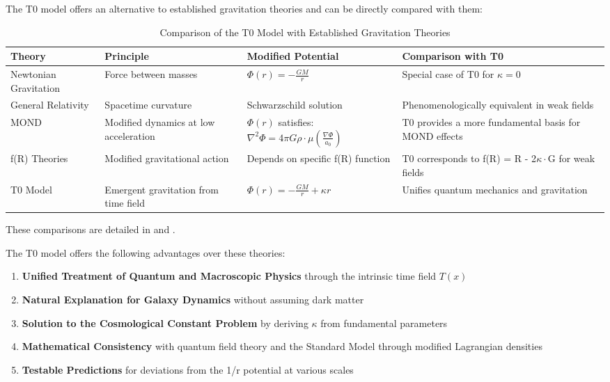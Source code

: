 \documentclass[12pt,a4paper]{article}
\begin{document}
	The T0 model offers an alternative to established gravitation theories and can be directly compared with them:
	
	\begin{table}[H]
		\centering
		\begin{tabular}{p{3cm}p{3cm}p{4cm}p{4cm}}
			\toprule
			\textbf{Theory} & \textbf{Principle} & \textbf{Modified Potential} & \textbf{Comparison with T0} \\
			\midrule
			Newtonian Gravitation & Force between masses & $\Phi(r) = -\frac{GM}{r}$ & Special case of T0 for $\kappa=0$ \\
			General Relativity & Spacetime curvature & Schwarzschild solution & Phenomenologically equivalent in weak fields \\
			MOND & Modified dynamics at low acceleration & $\Phi(r)$ satisfies: $\nabla^2\Phi = 4\pi G\rho\cdot\mu(\frac{\nabla\Phi}{a_0})$ & T0 provides a more fundamental basis for MOND effects \\
			f(R) Theories & Modified gravitational action & Depends on specific f(R) function & T0 corresponds to f(R) = R - 2$\kappa\cdot$G for weak fields \\
			T0 Model & Emergent gravitation from time field & $\Phi(r) = -\frac{GM}{r} + \kappa r$ & Unifies quantum mechanics and gravitation \\
			\bottomrule
		\end{tabular}
		\caption{Comparison of the T0 Model with Established Gravitation Theories}
		\label{tab:theory_comparison}
	\end{table}
	
	These comparisons are detailed in \cite{pascher_galaxies_2025} and \cite{pascher_emergente_gravitation_2025}.
	
	The T0 model offers the following advantages over these theories:
	
	\begin{enumerate}
		\item \textbf{Unified Treatment of Quantum and Macroscopic Physics} through the intrinsic time field $T(x)$
		\item \textbf{Natural Explanation for Galaxy Dynamics} without assuming dark matter
		\item \textbf{Solution to the Cosmological Constant Problem} by deriving $\kappa$ from fundamental parameters
		\item \textbf{Mathematical Consistency} with quantum field theory and the Standard Model through modified Lagrangian densities
		\item \textbf{Testable Predictions} for deviations from the 1/r potential at various scales
	\end{enumerate}
	
\end{document}
